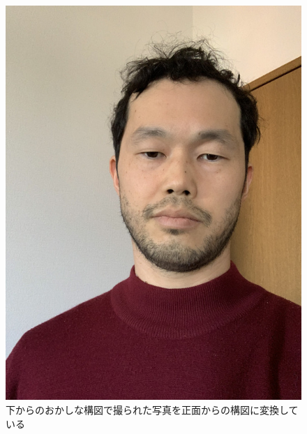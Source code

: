 \documentclass[12pt, unicode]{beamer}
\begin{document}
\begin{frame}
\begin{figure}[htbp]
\begin{minipage}[b]{0.4\linewidth}
    \includegraphics[keepaspectratio, scale=0.15]{pic2.jpg}
  \end{minipage}
  \caption{下からのおかしな構図で撮られた写真を正面からの構図に変換している}
\end{figure}

\end{frame}
\end{document}
